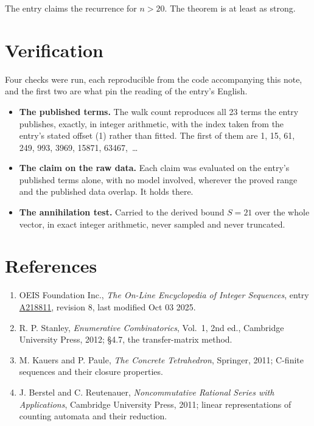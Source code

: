 \documentclass[11pt]{article}
\theoremstyle{definition}
\begin{document}
The entry claims the recurrence for $n > 20$. The theorem is at least as strong.

\section{Verification}

Four checks were run, each reproducible from the code accompanying this note, and the first two are what pin the reading of the entry's English.

\begin{itemize}

\item {\bfseries The published terms.} The walk count reproduces all 23 terms the entry publishes, exactly, in integer arithmetic, with the index taken from the entry's stated offset (1) rather than fitted. The first of them are 1, 15, 61, 249, 993, 3969, 15871, 63467,~\dots

\item {\bfseries The claim on the raw data.} Each claim was evaluated on the entry's published terms alone, with no model involved, wherever the proved range and the published data overlap. It holds there.

\item {\bfseries The annihilation test.} Carried to the derived bound $S = 21$ over the whole vector, in exact integer arithmetic, never sampled and never truncated.

\end{itemize}

\section{References}

\begin{enumerate}

\item OEIS Foundation Inc., \emph{The On-Line Encyclopedia of Integer Sequences}, entry \href{https://oeis.org/A218811}{A218811}, revision 8, last modified Oct 03 2025.

\item R. P. Stanley, \emph{Enumerative Combinatorics}, Vol.~1, 2nd ed., Cambridge University Press, 2012; \S4.7, the transfer-matrix method.

\item M. Kauers and P. Paule, \emph{The Concrete Tetrahedron}, Springer, 2011; C-finite sequences and their closure properties.

\item J. Berstel and C. Reutenauer, \emph{Noncommutative Rational Series with Applications}, Cambridge University Press, 2011; linear representations of counting automata and their reduction.

\end{enumerate}
\end{document}
